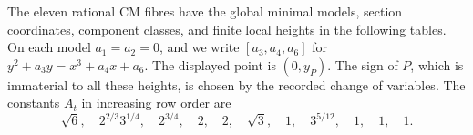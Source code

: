 \begin{proposition}\hypertarget{tag-000X}{}\label{ari:C.6.3}

The eleven rational CM fibres have the global minimal models,
section coordinates, component classes, and finite local heights
in the following tables. On each model $a_1=a_2=0$, and we
write $[a_3,a_4,a_6]$ for
$y^2+a_3y=x^3+a_4x+a_6$. The displayed point is $(0,y_P)$.
The sign of $P$, which is immaterial to all these heights,
is chosen by the recorded change of variables.
The constants $A_t$ in increasing row order are
\[
 \sqrt6,\quad 2^{2/3}3^{1/4},\quad 2^{3/4},\quad
 2,\quad 2,\quad \sqrt3,\quad 1,\quad 3^{5/12},\quad
 1,\quad1,\quad1.
\]
\end{proposition}


